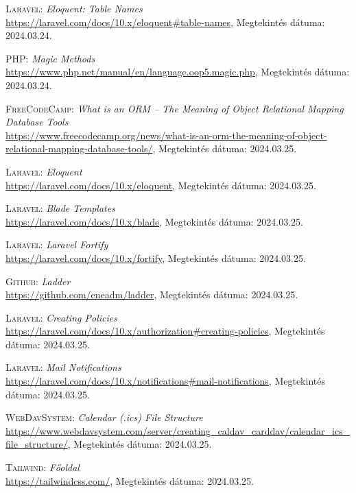 \documentclass[
]{thesis-ekf}
\theoremstyle{definition}
\theoremstyle{remark}
\begin{document}
\begin{thebibliography}{19}
\textsc{Laravel}: \emph{Eloquent: Table Names}
\\
\url{https://laravel.com/docs/10.x/eloquent#table-names}, Megtekintés dátuma: 2024.03.24.

\textsc{PHP}: \emph{Magic Methods}
\\
\url{https://www.php.net/manual/en/language.oop5.magic.php}, Megtekintés dátuma: 2024.03.24.

\textsc{FreeCodeCamp}: \emph{What is an ORM – The Meaning of Object Relational Mapping Database Tools}
\\
\url{https://www.freecodecamp.org/news/what-is-an-orm-the-meaning-of-object-relational-mapping-database-tools/}, Megtekintés dátuma: 2024.03.25.

\textsc{Laravel}: \emph{Eloquent}
\\
\url{https://laravel.com/docs/10.x/eloquent}, Megtekintés dátuma: 2024.03.25.

\textsc{Laravel}: \emph{Blade Templates}
\\
\url{https://laravel.com/docs/10.x/blade}, Megtekintés dátuma: 2024.03.25.

\textsc{Laravel}: \emph{Laravel Fortify}
\\
\url{https://laravel.com/docs/10.x/fortify}, Megtekintés dátuma: 2024.03.25.

\textsc{Github}: \emph{Ladder}
\\
\url{https://github.com/eneadm/ladder}, Megtekintés dátuma: 2024.03.25.

\textsc{Laravel}: \emph{Creating Policies}
\\
\url{https://laravel.com/docs/10.x/authorization#creating-policies}, Megtekintés dátuma: 2024.03.25.

\textsc{Laravel}: \emph{Mail Notifications}
\\
\url{https://laravel.com/docs/10.x/notifications#mail-notifications}, Megtekintés dátuma: 2024.03.25.

\textsc{WebDavSystem}: \emph{Calendar (.ics) File Structure}
\\
\url{https://www.webdavsystem.com/server/creating_caldav_carddav/calendar_ics_file_structure/}, Megtekintés dátuma: 2024.03.25.

\textsc{Tailwind}: \emph{Főoldal}
\\
\url{https://tailwindcss.com/}, Megtekintés dátuma: 2024.03.25.


\end{thebibliography}
\end{document}
